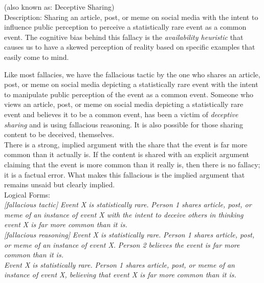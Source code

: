 \documentclass[a4paper,12pt,single,pdftex]{scrartcl}
\begin{document}
      (also known as: Deceptive Sharing)
    \\

  
    Description: Sharing an article, post, or meme on social media with the intent to influence public perception to perceive a statistically rare event as a common event. The cognitive bias behind this fallacy is the {\em availability heuristic} that causes us to have a skewed perception of reality based on specific examples that easily come to mind.

    
      Like most fallacies, we have the fallacious tactic by the one who shares an article, post, or meme on social media depicting a statistically rare event with the intent to manipulate public perception of the event as a common event. Someone who views an article, post, or meme on social media depicting a statistically rare event and believes it to be a common event, has been a victim of {\em deceptive sharing} and is using fallacious reasoning. It is also possible for those sharing content to be deceived, themselves.
    \\

    
      There is a strong, implied argument with the share that the event is far more common than it actually is. If the content is shared with an explicit argument claiming that the event is more common than it really is, then there is no fallacy; it is a factual error. What makes this fallacious is the implied argument that remains unsaid but clearly implied.
    \\

    
      Logical Forms:
    \\

    
      {\em [fallacious tactic]} \newline
{\em Event X is statistically rare.} \newline
{\em Person 1 shares article, post, or meme of an instance of event X with the intent to deceive others in thinking event X is far more common than it is.}
    \\

    
      {\em [fallacious reasoning]} \newline
{\em Event X is statistically rare.} \newline
{\em Person 1 shares article, post, or meme of an instance of event X.} \newline
{\em Person 2 believes the event is far more common than it is.}
    \\

    
      {\em Event X is statistically rare.} \newline
{\em Person 1 shares article, post, or meme of an instance of event X, believing that event X is far more common than it is.}
    \\
\end{document}
